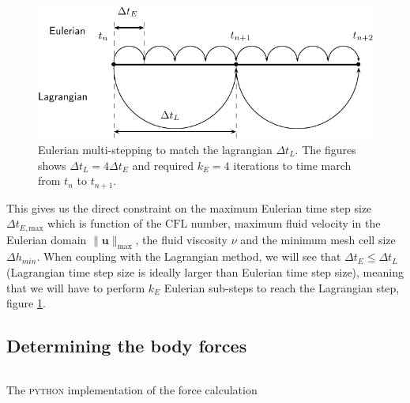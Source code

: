 	\begin{figure}[t]
	\centering
	\includegraphics[width=0.7\linewidth]{./figures/eulerian/multiStep-crop.pdf}
	\caption{Eulerian multi-stepping to match the lagrangian $\Delta t_L$. The figures shows $\Delta t_L = 4 \Delta t_E$ and required $k_E = 4$ iterations to time march from $t_n$ to $t_{n+1}$.}
	\label{fig:multiStep}
	\end{figure}		
	
This gives us the direct constraint on the maximum Eulerian time step size $\Delta t_{E,\mathrm{max}}$ which is function of the $\mathrm{CFL}$ number, maximum fluid velocity in the Eulerian domain $\lVert \mathbf{u} \rVert_{\mathrm{max}}$, the fluid viscosity $\nu$ and the minimum mesh cell size $\Delta h_{min}$. When coupling with the Lagrangian method, we will see that $\Delta t_E \le \Delta t_L$ (Lagrangian time step size is ideally larger than Eulerian time step size), meaning that we will have to perform $k_E$ Eulerian sub-steps to reach the Lagrangian step, figure \ref{fig:multiStep}.

\subsection{Determining the body forces}

	\begin{listing}[t]
	\inputminted[fontseries=courier,obeytabs,fontsize=\footnotesize,mathescape,linenos,numbersep=5pt,frame=lines,framesep=2mm,xleftmargin=20mm,xrightmargin=20mm]{python}{figures/eulerian/forces.py}
	\caption{The \textsc{python} implementation of the force calculation}
	\label{lst:pycode-forceCalculation}
	\end{listing}

